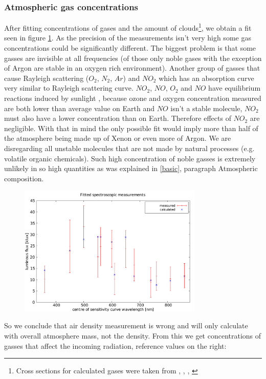 \documentclass{cfp}
\begin{document}
\subsubsection{Atmospheric gas concentrations}
After fitting concentrations of gases and the amount of clouds\footnote{Cross sections for calculated gases were taken from \cite{cross1}, \cite{cross2}, \cite{cross3}, \cite{cross4}}, we obtain a fit seen in figure \ref{spectrome}. As the precision of the measurements isn't very high some gas concentrations could be significantly different. The biggest problem is that some gasses are invisible at all frequencies (of those only noble gases with the exception of Argon are stable in an oxygen rich environment). Another group of gasses that cause Rayleigh scattering ($O_2$, $N_2$, $Ar$) and $NO_2$ which has an absorption curve very similar to Rayleigh scattering curve. $NO_2$, $NO$, $O_2$ and $NO$ have equilibrium reactions induced by sunlight \cite{no2o3}, because ozone and oxygen concentration measured are both lower than average value on Earth and $NO$ isn't a stable molecule, $NO_2$ must also have a lower concentration than on Earth. Therefore effects of $NO_2$ are negligible. With that in mind the only possible fit would imply more than half of the atmosphere being made up of Xenon or even more of Argon. We are disregarding all unstable molecules that are not made by natural processes (e.g. volatile organic chemicals). Such high concentration of noble gasses is extremely unlikely in so high quantities as was explained in \ref{basic}, paragraph Atmospheric composition.\par
\begin{figure}[!h]
\centering
\caption{}
\includegraphics[width=250pt]{spectromeasure.pdf}
\label{spectrome}
\end{figure}
So we conclude that air density measurement is wrong and will only calculate with overall atmosphere mass, not the density. From this we get concentrations of gasses that affect the incoming radiation, reference values on the right:\\
\end{document}
